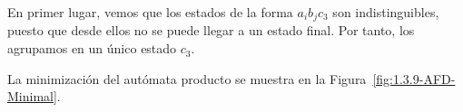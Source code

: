 \begin{ejercicio}
    En primer lugar, vemos que los estados de la forma $a_ib_jc_3$ son indistinguibles, puesto que desde ellos no se puede llegar a un estado final. Por tanto, los agrupamos en un único estado $c_3$.

    La minimización del autómata producto se muestra en la Figura~\ref{fig:1.3.9-AFD-Minimal}.
    \begin{table}
        \centering
\end{table}
\end{ejercicio}
